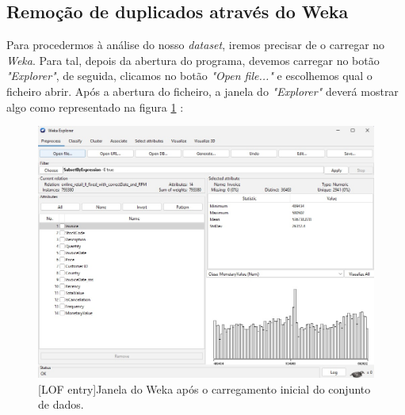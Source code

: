 \documentclass{easychair}
\begin{document}

\subsection{Remoção de duplicados através do Weka}

Para procedermos à análise do nosso \textit{dataset}, iremos precisar de o carregar no \textit{Weka}. Para tal, depois da abertura do programa, devemos carregar no botão \textit{"Explorer"}, de seguida, clicamos no botão \textit{"Open file..."} e escolhemos qual o ficheiro abrir. Após a abertura do ficheiro, a janela do \textit{"Explorer"} deverá mostrar algo como representado na figura \ref{fig2} :

\begin{figure}[H]
    \begin{centering}
    \includegraphics[width=0.7\linewidth]{imagens/figure2.jpg}\label{cap-2-fig2}
    [LOF entry]{Janela do Weka após o carregamento inicial do conjunto de dados.}
    \label{fig2}
    \end{centering}
\end{figure}
\end{document}
